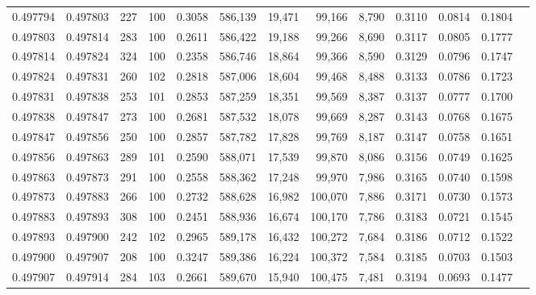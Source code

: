 \begin{tabular}{rrrrrrrrrrrrr}
0.497794 & 0.497803 &   227 & 100 &                                     0.3058 & 586,139 &  19,471 &  99,166 &   8,790 & 0.3110 & 0.0814 & 0.1804 \\
0.497803 & 0.497814 &   283 & 100 &                                     0.2611 & 586,422 &  19,188 &  99,266 &   8,690 & 0.3117 & 0.0805 & 0.1777 \\
0.497814 & 0.497824 &   324 & 100 &                                     0.2358 & 586,746 &  18,864 &  99,366 &   8,590 & 0.3129 & 0.0796 & 0.1747 \\
0.497824 & 0.497831 &   260 & 102 &                                     0.2818 & 587,006 &  18,604 &  99,468 &   8,488 & 0.3133 & 0.0786 & 0.1723 \\
0.497831 & 0.497838 &   253 & 101 &                                     0.2853 & 587,259 &  18,351 &  99,569 &   8,387 & 0.3137 & 0.0777 & 0.1700 \\
0.497838 & 0.497847 &   273 & 100 &                                     0.2681 & 587,532 &  18,078 &  99,669 &   8,287 & 0.3143 & 0.0768 & 0.1675 \\
0.497847 & 0.497856 &   250 & 100 &                                     0.2857 & 587,782 &  17,828 &  99,769 &   8,187 & 0.3147 & 0.0758 & 0.1651 \\
0.497856 & 0.497863 &   289 & 101 &                                     0.2590 & 588,071 &  17,539 &  99,870 &   8,086 & 0.3156 & 0.0749 & 0.1625 \\
0.497863 & 0.497873 &   291 & 100 &                                     0.2558 & 588,362 &  17,248 &  99,970 &   7,986 & 0.3165 & 0.0740 & 0.1598 \\
0.497873 & 0.497883 &   266 & 100 &                                     0.2732 & 588,628 &  16,982 & 100,070 &   7,886 & 0.3171 & 0.0730 & 0.1573 \\
0.497883 & 0.497893 &   308 & 100 &                                     0.2451 & 588,936 &  16,674 & 100,170 &   7,786 & 0.3183 & 0.0721 & 0.1545 \\
0.497893 & 0.497900 &   242 & 102 &                                     0.2965 & 589,178 &  16,432 & 100,272 &   7,684 & 0.3186 & 0.0712 & 0.1522 \\
0.497900 & 0.497907 &   208 & 100 &                                     0.3247 & 589,386 &  16,224 & 100,372 &   7,584 & 0.3185 & 0.0703 & 0.1503 \\
0.497907 & 0.497914 &   284 & 103 &                                     0.2661 & 589,670 &  15,940 & 100,475 &   7,481 & 0.3194 & 0.0693 & 0.1477 \\

\end{tabular}
